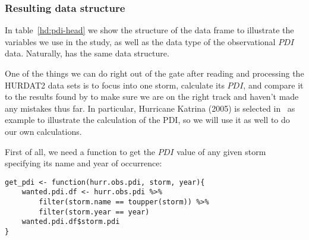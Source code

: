 \subsubsection{Resulting data structure}
In table~\ref{hd:pdi-head} we show the structure of the  data frame to illustrate the variables we use in the study, as well as the data type of the observational $PDI$ data. Naturally,  has the same data structure.
\begin{table}[H]
	\centering
	\ttfamily
	\caption{Excerpt of the  data frame}
	\label{hd:pdi-head}
\end{table}

One of the things we can do right out of the gate after reading and processing the HURDAT2 data sets is to focus into one storm, calculate its $PDI$, and compare it to the results found by \citeauthor{Corral2010} to make sure we are on the right track and haven't made any mistakes thus far. In particular, Hurricane Katrina (2005) is selected in~\cite{Corral2010} as example to illustrate the calculation of the PDI, so we will use it as well to do our own calculations.

First of all, we need a function to get the $PDI$ value of any given storm specifying its name and year of occurrence:
\begin{lstlisting}[caption=Function to get $PDI$ of a single storm, label=snp:hurdat-get-pdi]
get_pdi <- function(hurr.obs.pdi, storm, year){
	wanted.pdi.df <- hurr.obs.pdi %>%
		filter(storm.name == toupper(storm)) %>%
		filter(storm.year == year)
	wanted.pdi.df$storm.pdi
}
\end{lstlisting}

